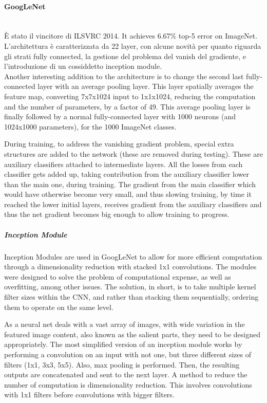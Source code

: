 \documentclass{article}
\begin{document}
\paragraph{GoogLeNet}\mbox{}\\
È stato il vincitore di ILSVRC 2014. It achieves 6.67\% top-5 error on ImageNet.
L'architettura è caratterizzata da 22 layer, con alcune novità per quanto riguarda gli strati fully connected, la gestione del problema del vanish del gradiente, e l'introduzione di un cossiddetto inception module.\\
Another interesting addition to the architecture is to change the second last fully-connected layer with an average pooling layer. This layer spatially averages the feature map, converting 7x7x1024 input to 1x1x1024, reducing the computation and the number of parameters, by a factor of 49. This average pooling layer is finally followed by a normal fully-connected layer with 1000 neurons (and 1024x1000 parameters), for the 1000 ImageNet classes.

During training, to address the vanishing gradient problem, special extra structures are added to the network (these are removed during testing). These are
auxiliary classifiers attached to intermediate layers. All the losses from each
classifier gets added up, taking contribution from the auxiliary classifier lower
than the main one, during training. The gradient from the main classifier which
would have otherwise become very small, and thus slowing training, by time it
reached the lower initial layers, receives gradient from the auxiliary classifiers
and thus the net gradient becomes big enough to allow training to progress.

\subparagraph{Inception Module}
Inception Modules are used in GoogLeNet to allow for more efficient computation through a dimensionality reduction with stacked 1x1 convolutions. The modules were designed to solve the problem of computational expense, as well as overfitting, among other issues. The solution, in short, is to take multiple kernel filter sizes within the CNN, and rather than stacking them sequentially, ordering them to operate on the same level. 

As a neural net deals with a vast array of images, with wide variation in the featured image content, also known as the salient parts, they need to be designed appropriately. The most simplified version of an inception module works by performing a convolution on an input with not one, but three different sizes of filters (1x1, 3x3, 5x5). Also, max pooling is performed. Then, the resulting outputs are concatenated and sent to the next layer.
A method to reduce the number of computation is dimensionality reduction. This involves convolutions with 1x1 filters before convolutions with bigger filters.
\end{document}
